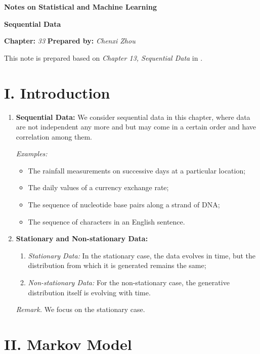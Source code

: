 \documentclass[12pt]{article}
\newcommand{\titlebox}[4]{
\begin{tcolorbox}[colback = blue!5!white!95, colframe = blue!70!black
]
  \noindent \textbf{ #1 } \hfill \textit{#2} 
  \begin{center}
  	 \LARGE{\textbf{#3}}
  \end{center}
\textbf{Chapter:} \textit{#4} \hfill \textbf{Prepared by:} \textit{Chenxi Zhou}
\end{tcolorbox}
}
\begin{document}
\titlebox{Notes on Statistical and Machine Learning}{}{Sequential Data}{33}
\thispagestyle{plain}

\vspace{10pt}

This note is prepared based on \textit{Chapter 13, Sequential Data} in \textcite{Bishop2016-tm}. 

\section*{I. Introduction}

\begin{enumerate}[label=\textbf{\arabic*.}]

	\item \textbf{Sequential Data:} We consider sequential data in this chapter, where data are not independent any more and but may come in a certain order and have correlation among them. 
	
	\textit{Examples:}
	\begin{itemize}
		\item The rainfall measurements on successive days at a particular location; 
		\item The daily values of a currency exchange rate; 
		\item The sequence of nucleotide base pairs along a strand of DNA; 
		\item The sequence of characters in an English sentence. 
	\end{itemize}
	
	\item \textbf{Stationary and Non-stationary Data:} 
	\begin{enumerate}
		\item \textit{Stationary Data:} In the stationary case, the data evolves in time, but the distribution from which it is generated remains the same; 
		\item \textit{Non-stationary Data:} For the non-stationary case, the generative distribution itself is evolving with time. 
	\end{enumerate}
	\textit{Remark.} We focus on the stationary case. 

\end{enumerate}


\section*{II. Markov Model}
\end{document}
